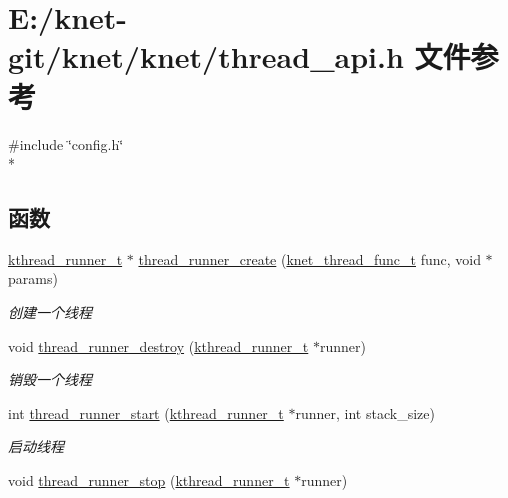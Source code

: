 \hypertarget{a00094}{}\section{E\+:/knet-\/git/knet/knet/thread\+\_\+api.h 文件参考}
\label{a00094}
{\ttfamily \#include \char`\"{}config.\+h\char`\"{}}\\*
\subsection*{函数}
\begin{DoxyCompactItemize}
\item 
\hyperlink{a00051_a4f78c259c9527c821f1a6f87495dd339_a4f78c259c9527c821f1a6f87495dd339}{kthread\+\_\+runner\+\_\+t} $\ast$ \hyperlink{a00109_gacc8838f250e5f685580a508e93d3f636_gacc8838f250e5f685580a508e93d3f636}{thread\+\_\+runner\+\_\+create} (\hyperlink{a00051_a8741dac4a9f8d97603eb3a30a3473b13_a8741dac4a9f8d97603eb3a30a3473b13}{knet\+\_\+thread\+\_\+func\+\_\+t} func, void $\ast$params)
\begin{DoxyCompactList}\small\item\em 创建一个线程 \end{DoxyCompactList}\item 
void \hyperlink{a00109_gaa9112d70f3e5a8dcf648ce531332f66a_gaa9112d70f3e5a8dcf648ce531332f66a}{thread\+\_\+runner\+\_\+destroy} (\hyperlink{a00051_a4f78c259c9527c821f1a6f87495dd339_a4f78c259c9527c821f1a6f87495dd339}{kthread\+\_\+runner\+\_\+t} $\ast$runner)
\begin{DoxyCompactList}\small\item\em 销毁一个线程 \end{DoxyCompactList}\item 
int \hyperlink{a00109_gae125061eb96b154766c0a414eb74065c_gae125061eb96b154766c0a414eb74065c}{thread\+\_\+runner\+\_\+start} (\hyperlink{a00051_a4f78c259c9527c821f1a6f87495dd339_a4f78c259c9527c821f1a6f87495dd339}{kthread\+\_\+runner\+\_\+t} $\ast$runner, int stack\+\_\+size)
\begin{DoxyCompactList}\small\item\em 启动线程 \end{DoxyCompactList}\item 
void \hyperlink{a00109_gac8644b2d2ca5580e0cac7378154ae2e0_gac8644b2d2ca5580e0cac7378154ae2e0}{thread\+\_\+runner\+\_\+stop} (\hyperlink{a00051_a4f78c259c9527c821f1a6f87495dd339_a4f78c259c9527c821f1a6f87495dd339}{kthread\+\_\+runner\+\_\+t} $\ast$runner)

\end{DoxyCompactItemize}
